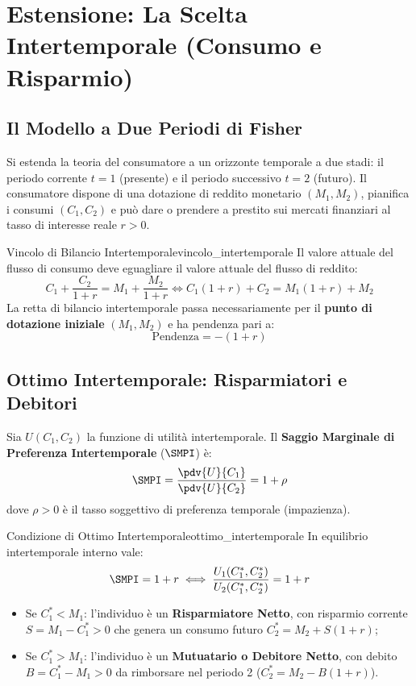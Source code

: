 \section{Estensione: La Scelta Intertemporale (Consumo e Risparmio)}

\subsection{Il Modello a Due Periodi di Fisher}
Si estenda la teoria del consumatore a un orizzonte temporale a due stadi: il periodo corrente $t=1$ (presente) e il periodo successivo $t=2$ (futuro).
Il consumatore dispone di una dotazione di reddito monetario $(M_1, M_2)$, pianifica i consumi $(C_1, C_2)$ e può dare o prendere a prestito sui mercati finanziari al tasso di interesse reale $r > 0$.

\begin{definizione}{Vincolo di Bilancio Intertemporale}{vincolo_intertemporale}
Il valore attuale del flusso di consumo deve eguagliare il valore attuale del flusso di reddito:
\begin{equation}
    C_1 + \frac{C_2}{1+r} = M_1 + \frac{M_2}{1+r} \iff C_1(1+r) + C_2 = M_1(1+r) + M_2
\end{equation}
La retta di bilancio intertemporale passa necessariamente per il \textbf{punto di dotazione iniziale} $(M_1, M_2)$ e ha pendenza pari a:
\begin{equation}
    \text{Pendenza} = - (1 + r)
\end{equation}
\end{definizione}

\subsection{Ottimo Intertemporale: Risparmiatori e Debitori}
Sia $U(C_1, C_2)$ la funzione di utilità intertemporale. Il \textbf{Saggio Marginale di Preferenza Intertemporale} ($\SMPI$) è:
\begin{equation}
    \SMPI = \frac{\pdv{U}{C_1}}{\pdv{U}{C_2}} = 1 + \rho
\end{equation}
dove $\rho > 0$ è il tasso soggettivo di preferenza temporale (impazienza).

\begin{teorema}{Condizione di Ottimo Intertemporale}{ottimo_intertemporale}
In equilibrio intertemporale interno vale:
\begin{equation}
    \SMPI = 1 + r \iff \frac{U_1(C_1^*, C_2^*)}{U_2(C_1^*, C_2^*)} = 1 + r
\end{equation}
\begin{itemize}
    \item Se $C_1^* < M_1$: l'individuo è un \textbf{Risparmiatore Netto}, con risparmio corrente $S = M_1 - C_1^* > 0$ che genera un consumo futuro $C_2^* = M_2 + S(1+r)$;
    \item Se $C_1^* > M_1$: l'individuo è un \textbf{Mutuatario o Debitore Netto}, con debito $B = C_1^* - M_1 > 0$ da rimborsare nel periodo 2 ($C_2^* = M_2 - B(1+r)$).
\end{itemize}
\end{teorema}

